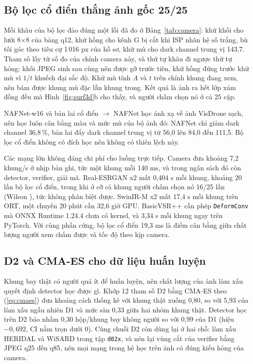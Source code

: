 \subsection{Bộ lọc cổ điển thắng ảnh gốc 25/25}

Mỗi khâu của bộ lọc đảo đúng một lỗi đã đo ở Bảng~\ref{tab:camera}: khử khối cho lưới 8$\times$8 của bảng q12, khử hồng cho kênh G bị cắt khi ISP nhân hệ số trắng, bù tối góc theo tiêu cự 1\,016 px của hồ sơ, khử mù cho dark channel trung vị 143,7. Tham số lấy từ số đo của chính camera này, và thứ tự khâu đi ngược thứ tự hỏng: khối JPEG sinh sau cùng nên được gỡ trước tiên, khử hồng đứng trước khử mù vì $1/t$ khuếch đại sắc độ. Khử mù tính $A$ và $t$ trên chính khung đang xem, nên bám được khung mù đặc lẫn khung trong. Kết quả là ảnh ra hết lớp xám đồng đều mà Hình~\ref{fig:surf3d}b cho thấy, và người chấm chọn nó ở cả 25 cặp.

NAFNet-w16 và bản lai cổ điển $\to$ NAFNet học ánh xạ về ảnh VisDrone sạch, nên học luôn cân bằng màu và mức mù của bộ ảnh đó: NAFNet chỉ giảm dark channel 36,8\,\%, bản lai đẩy dark channel trung vị từ 56,0 lên 84,0 đến 111,5. Bộ lọc cổ điển không có đích học nên không có thiên lệch này.

Các mạng lớn không đáng chi phí cho luồng trực tiếp. Camera đưa khoảng 7,2 khung/s ở nhịp bản ghi, tức một khung mỗi 140 ms, và trong ngân sách đó còn detector, verifier, giải mã. Real-ESRGAN x2 mất 0,404 s mỗi khung, khoảng 20 lần bộ lọc cổ điển, trong khi ở cỡ cả khung người chấm chọn nó 16/25 lần (Wilson ), tức không phân biệt được. SwinIR-M x2 mất 17,4 s mỗi khung trên ORT, một chuyến 20 phút cần 32,6 giờ GPU. BasicVSR++ cần phép \texttt{DeformConv} mà ONNX Runtime 1.24.4 chưa có kernel, và 3,34 s mỗi khung ngay trên PyTorch. Với cùng phần cứng, bộ lọc cổ điển 19,3 ms là điểm cân bằng giữa chất lượng người xem chấm được và tốc độ theo kịp camera.

\subsection{D2 và CMA-ES cho dữ liệu huấn luyện}

Khung bay thật có người quá ít để huấn luyện, nên chất lượng của ảnh làm xấu quyết định detector học được gì. Khớp 12 tham số D2 bằng CMA-ES theo (\ref{eq:cmaes}) đưa khoảng cách thống kê với khung thật xuống 0,80, so với 5,93 của làm xấu ngẫu nhiên D1 và mức sàn 0,33 giữa hai nhóm khung thật. Detector học trên D2 báo nhầm 0,30 hộp/khung bay không người so với 0,99 của D1 (hiệu $-0{,}692$, CI nằm trọn dưới 0). Cùng chuỗi D2 còn dùng lại ở hai chỗ: làm xấu HERIDAL và WiSARD trong tập \texttt{d02x}, và nén lại vùng cắt của verifier bằng JPEG q25 đến q85, nên mọi mạng trong hệ học trên ảnh có đúng kiểu hỏng của camera.

